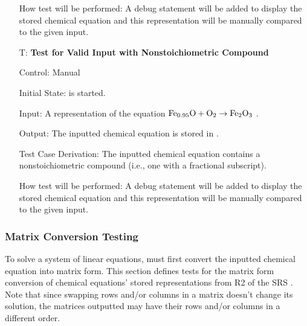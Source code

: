 \documentclass[12pt, titlepage]{article}
\newcounter{testnum} %
\begin{document}
\begin{enumerate}
    How test will be performed: A debug statement will be added to display the
    stored chemical equation and this representation will be manually compared to
    the given input.

  \item[T\refstepcounter{testnum}\thetestnum \label{test_nonstoich_valid_input}:]
    \textbf{Test for Valid Input with Nonstoichiometric Compound}

    Control: Manual

    Initial State: \progname{} is started.

    Input: A representation of the equation
    $\ce{Fe_{0.95}O} + \ce{O2} \rightarrow \ce{Fe2O3}$
    \cite{doubtnut_when_nodate}.

    Output: The inputted chemical equation is stored in \progname{}.

    Test Case Derivation: The inputted chemical equation contains a
    nonstoichiometric compound (i.e., one with a fractional subscript).

    How test will be performed: A debug statement will be added to display the
    stored chemical equation and this representation will be manually compared to
    the given input.

\end{enumerate}

\subsubsection{Matrix Conversion Testing}

To solve a system of linear equations, \progname{} must first convert the
inputted chemical equation into matrix form. This section defines tests for
the matrix form conversion of chemical equations' stored representations from
R2 of the SRS . 
Note that since swapping rows and/or columns in a matrix doesn't change its
solution, the matrices outputted may have their rows and/or columns in a
different order.
\end{document}
